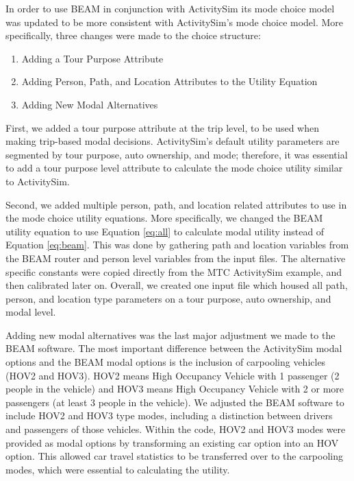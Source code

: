 \documentclass[fancy, masters]{byuthesis}
\providecommand{\tightlist}{%
  \setlength{\itemsep}{0pt}\setlength{\parskip}{0pt}}
\begin{document}
In order to use BEAM in conjunction with ActivitySim its mode choice model was updated to be more consistent with ActivitySim's mode choice model. More specifically, three changes were made to the choice structure:

\begin{enumerate}
\def\labelenumi{\arabic{enumi}.}
\tightlist
\item
  Adding a Tour Purpose Attribute
\item
  Adding Person, Path, and Location Attributes to the Utility Equation
\item
  Adding New Modal Alternatives
\end{enumerate}

First, we added a tour purpose attribute at the trip level, to be used when making trip-based modal decisions. ActivitySim's default utility parameters are segmented by tour purpose, auto ownership, and mode; therefore, it was essential to add a tour purpose level attribute to calculate the mode choice utility similar to ActivitySim.

Second, we added multiple person, path, and location related attributes to use in the mode choice utility equations. More specifically, we changed the BEAM utility equation to use Equation \eqref{eq:all} to calculate modal utility instead of Equation \eqref{eq:beam}. This was done by gathering path and location variables from the BEAM router and person level variables from the input files. The alternative specific constants were copied directly from the MTC ActivitySim example, and then calibrated later on. Overall, we created one input file which housed all path, person, and location type parameters on a tour purpose, auto ownership, and modal level.

Adding new modal alternatives was the last major adjustment we made to the BEAM software. The most important difference between the ActivitySim modal options and the BEAM modal options is the inclusion of carpooling vehicles (HOV2 and HOV3). HOV2 means High Occupancy Vehicle with 1 passenger (2 people in the vehicle) and HOV3 means High Occupancy Vehicle with 2 or more passengers (at least 3 people in the vehicle). We adjusted the BEAM software to include HOV2 and HOV3 type modes, including a distinction between drivers and passengers of those vehicles. Within the code, HOV2 and HOV3 modes were provided as modal options by transforming an existing car option into an HOV option. This allowed car travel statistics to be transferred over to the carpooling modes, which were essential to calculating the utility.
\end{document}

